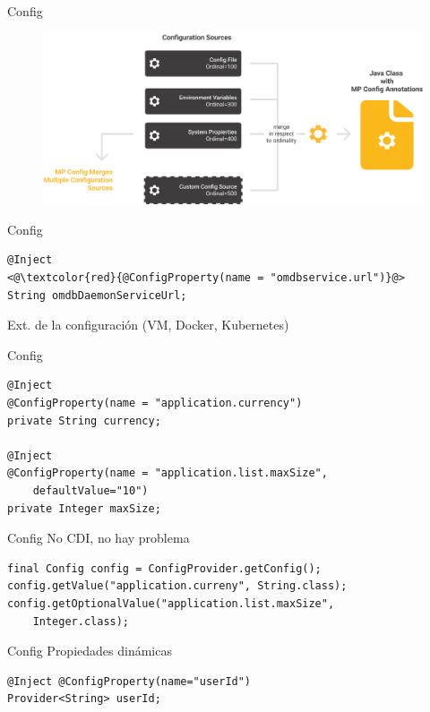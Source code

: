 \documentclass[aspectratio=169]{beamer}
\begin{document}
\begin{frame}{Config}
\begin{figure}
	\centering
	\includegraphics[width=0.8\linewidth]{Images/mpconfig}
\end{figure}
\end{frame}




\begin{frame}[fragile]{Config}
\begin{lstlisting}
@Inject
<@\textcolor{red}{@ConfigProperty(name = "omdbservice.url")}@>
String omdbDaemonServiceUrl;
\end{lstlisting}

Ext. de la configuración (VM, Docker, Kubernetes)
\end{frame}



\begin{frame}[fragile]{Config}
\begin{lstlisting}
@Inject
@ConfigProperty(name = "application.currency")
private String currency;

@Inject
@ConfigProperty(name = "application.list.maxSize",
	defaultValue="10")
private Integer maxSize;
\end{lstlisting}
\end{frame}

\begin{frame}[fragile]{Config}
No CDI, no hay problema
\begin{lstlisting}
final Config config = ConfigProvider.getConfig();
config.getValue("application.curreny", String.class);
config.getOptionalValue("application.list.maxSize",
	Integer.class);
\end{lstlisting}
\end{frame}

\begin{frame}[fragile]{Config}
Propiedades dinámicas
\begin{lstlisting}
@Inject @ConfigProperty(name="userId")
Provider<String> userId;
\end{lstlisting}
\end{frame}
\end{document}
